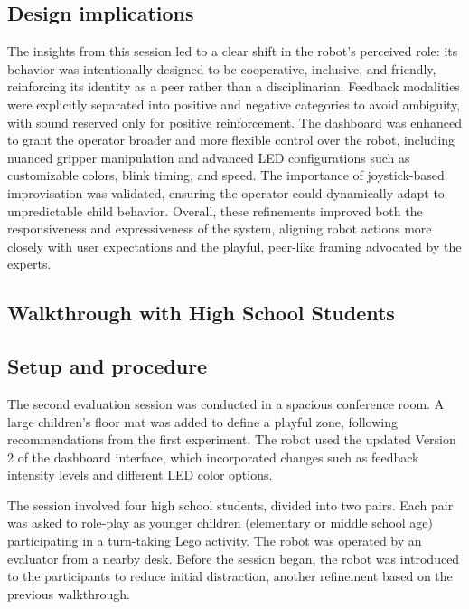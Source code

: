 \documentclass[a4paper]{usiinfbachelorproject}
\begin{document}
\subsection*{\textbf{Design implications}}
The insights from this session led to a clear shift in the robot's perceived role: its behavior was intentionally designed to be cooperative, inclusive, and friendly, reinforcing its identity as a peer rather than a disciplinarian.
Feedback modalities were explicitly separated into positive and negative categories to avoid ambiguity, with sound reserved only for positive reinforcement.
The dashboard was enhanced to grant the operator broader and more flexible control over the robot, including nuanced gripper manipulation and advanced LED configurations such as customizable colors, blink timing, and speed.
The importance of joystick-based improvisation was validated, ensuring the operator could dynamically adapt to unpredictable child behavior.
Overall, these refinements improved both the responsiveness and expressiveness of the system, aligning robot actions more closely with user expectations and the playful, peer-like framing advocated by the experts.

\subsection{\textbf{Walkthrough with High School Students}}\label{sec:high-school-walkthrough}
\subsection*{\textbf{Setup and procedure}}
The second evaluation session was conducted in a spacious conference room.
A large children's floor mat was added to define a playful zone, following recommendations from the first experiment.
The robot used the updated Version 2 of the dashboard interface, which incorporated changes such as feedback intensity levels and different LED color options.

The session involved four high school students, divided into two pairs.
Each pair was asked to role-play as younger children (elementary or middle school age) participating in a turn-taking Lego activity.
The robot was operated by an evaluator from a nearby desk.
Before the session began, the robot was introduced to the participants to reduce initial distraction, another refinement based on the previous walkthrough.
\end{document}
